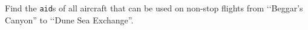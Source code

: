 Find the \texttt{aid}s of all aircraft that can be used on non-stop flights from
\lq\lq Beggar's Canyon'' to \lq\lq Dune Sea Exchange''.

